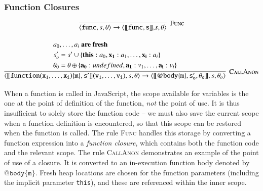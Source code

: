 \documentclass[12pt,a4paper,twoside,openright]{report}
\theoremstyle{definition}
\theoremstyle{dotless}
\newcommand*{\js}{\texttt}
\begin{document}
\subsubsection*{Function Closures}

$$\infer[\textsc{Func}]
{\langle \mathtt{func}, s, \theta\rangle \rightarrow
  \langle\mathtt{[\![func, s]\!],} s, \theta\rangle}{}$$

$$\infer[\textsc{CallAnon}]
{\langle\mathtt{[\![function(x_1, \dots, x_i)\{m\},s']\!](v_1, \dots, v_i)}, s, \theta\rangle\rightarrow
  \langle\mathtt{[\![@body\{m\},s_o',\theta_o]\!]},s, \theta_o\rangle
}{
  \begin{split}
	&a_0, \dots, a_i\textbf{ are fresh} \\
	&s_o' = s' \cup \{\mathbf{this}: a_0, \mathbf{x_1}:a_1, \dots, \mathbf{x_i}: a_i\} \\
	&\theta_0 = \theta \oplus\{\mathbf{a_0}: undefined, \mathbf{a_1}:v_1, \dots, \mathbf{a_i}: v_i\}
  \end{split}
}$$

When a function is called in JavaScript, the scope available for variables is
the one at the point of definition of the function, \textit{not}
the point of use. It is thus insufficient to solely store the function code --
we must also save the current scope when a function definition is encountered,
so that this scope can be restored when the function is called. The rule
\textsc{Func} handles this storage by converting a function expression into a
\textit{function closure}, which contains both the function code and the
relevant scope. The rule \textsc{CallAnon} demonstrates an example of the point of use of a closure.
It is 
converted to an in-execution function body
denoted by $\mathtt{@body\{m\}}$. Fresh heap locations are chosen for the 
function parameters (including the implicit parameter \js{this}), and these
are referenced within the inner scope.

\end{document}
